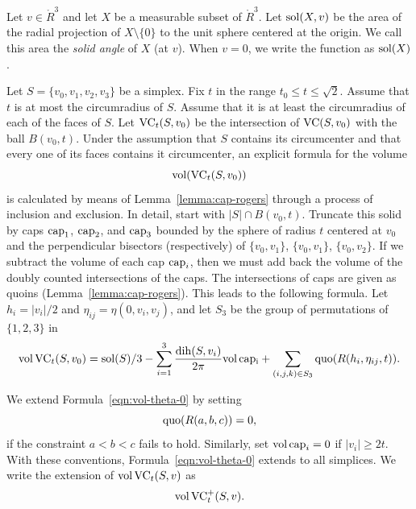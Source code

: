 \begin{definition}\label{def:sol}
Let $v\in\ring{R}^3$ and let $X$ be a measurable subset of
$\ring{R}^3$. Let $\operatorname{sol}(X,v)$ be the area of the radial projection
of $X\setminus\{0\}$ to the unit sphere centered at the origin. We
call this area the {\it solid angle\/} of $X$ (at $v$).  When
$v=0$, we write the function as $\operatorname{sol}(X)$.
\end{definition}


Let $S=\{v_0,v_1,v_2,v_3\}$ be a simplex. Fix $t$ in the range
$t_0\le t\le\sqrt2$.  Assume that $t$ is at most the circumradius
of $S$. Assume that it is at least the circumradius of each of the
faces of $S$.  Let ${\operatorname{VC}}_t(S,v_0)$ be the intersection of
${\operatorname{VC}}(S,v_0)$ with the ball $B(v_0,t)$. Under the assumption
that $S$ contains its circumcenter and that every one of its faces
contains it circumcenter, an explicit formula for the volume
$${\operatorname{vol}}({\operatorname{VC}}_t(S,v_0))$$ is calculated by means of
Lemma~\ref{lemma:cap-rogers} through a process of inclusion and
exclusion. In detail, start with $|S|\cap B(v_0,t)$. Truncate this
solid by caps ${\operatorname{cap}}_1$, ${\operatorname{cap}}_2$, and
${\operatorname{cap}}_3$ bounded by the sphere of radius $t$ centered at $v_0$
and the perpendicular bisectors (respectively) of $\{v_0,v_1\}$,
$\{v_0,v_1\}$, $\{v_0,v_2\}$.  If we subtract the volume of each
cap ${\operatorname{cap}}_i$, then we must add back the volume of the doubly
counted intersections of the caps.  The intersections of caps are
given as quoins (Lemma~\ref{lemma:cap-rogers}).  This leads to the
following formula. Let $h_i = |v_i|/2$ and
$\eta_{ij}=\eta(0,v_i,v_j)$, and let $S_3$ be the group of
permutations of $\{1,2,3\}$ in
\begin{equation}
   {\operatorname{vol}}\,{\operatorname{VC}}_t(S,v_0) =
   \operatorname{sol}(S)/3 - \sum_{i=1}^3 \frac{\operatorname{dih}(S,v_i)}{2\pi}{\operatorname{vol}}\,{\operatorname{cap_i}}
   +\sum_{(i,j,k)\in S_3} \operatorname{quo}(R(h_i,\eta_{ij},t)).
   \label{eqn:vol-theta-0}
\end{equation}


We extend Formula~\ref{eqn:vol-theta-0} by setting
    $$\operatorname{quo}(R(a,b,c)) = 0,$$
if the constraint $a < b < c$ fails to hold.  Similarly, set
${\operatorname{vol}}\,{\operatorname{cap}}_i=0$ if $|v_i|\ge 2t$.  With these
conventions,  Formula~\ref{eqn:vol-theta-0} extends to all
simplices.  We write the extension of ${\operatorname{vol}}\,{\operatorname{VC}}_t(S,v)$
as
$${\operatorname{vol}}\,{{\operatorname{VC}}^+_t}(S,v).$$



